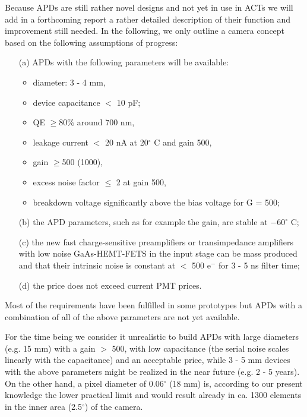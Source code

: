 Because APDs are still rather novel designs and not yet in use in ACTs we
will add in a forthcoming report
a rather detailed description of their function and
improvement still needed. In the following, we only outline a camera concept
based on the following assumptions of progress:

\begin{itemize}
\item[(a)]  APDs with the following parameters will be available:

\begin{itemize}
\item  diameter: 3 - 4 mm,

\item  device capacitance $<$ 10 pF;

\item  QE $\geq 80\%$ around 700 nm,

\item  leakage current $<$ 20 nA at 20$^{\circ }$ C and gain 500,

\item  gain $\geq $500 (1000),

\item  excess noise factor $\leq $ 2 at gain 500,

\item  breakdown voltage significantly above the bias voltage for G = 500;
\end{itemize}

\item[(b)]  the APD parameters, such as for example the gain, are stable at $-60^{\circ }$ C;

\item[(c)]  the new fast charge-sensitive preamplifiers or transimpedance
amplifiers with low noise GaAs-HEMT-FETS in the input stage can be mass
produced and that their intrinsic noise is constant at $<$ 500 e$^-$ for 3 - 5
ns filter time;

\item[(d)]  the price does not exceed current PMT prices.
\end{itemize}

Most of the requirements have been fulfilled in some prototypes but APDs
with a combination of all of the above parameters are not yet available.

For the time being we consider it unrealistic to build APDs with large
diameters (e.g. 15 mm) with a gain $>$ 500, with low capacitance (the serial
noise scales linearly with the capacitance) and an acceptable price, while 3
- 5 mm devices with the above parameters might be realized in the near
future (e.g. 2 - 5 years). On the other hand, a pixel diameter of 0.06$%
^{\circ }$ (18 mm) is, according to our present knowledge the lower
practical limit and would result already in ca. 1300 elements in the inner
area (2.5$^{\circ }$) of the camera.

